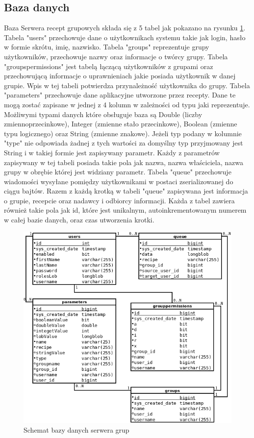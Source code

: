 \documentclass[11pt,a4paper,polish,thesis]{dcsbook}
\begin{document}
\subsection{Baza danych}
Baza Serwera recept grupowych składa się z 5 tabel jak pokazano na rysunku \ref{fig:server_db}. 
Tabela "users" przechowuje  dane o użytkownikach systemu takie jak login, hasło w formie skrótu, imię, nazwisko.
Tabela "groups" reprezentuje grupy użytkowników, przechowuje nazwy oraz informacje o twórcy grupy.
Tabela "groupspermissions" jest tabelą łączącą użytkowników z grupami oraz przechowującą informacje o uprawnieniach jakie posiada użytkownik w danej grupie. 
Wpis w tej tabeli potwierdza przynależność użytkownika do grupy.
Tabela "parameters" przechowuje dane aplikacyjne utworzone przez recepty. 
Dane te mogą zostać zapisane w jednej z 4 kolumn w zależności od typu jaki reprezentuje. 
Możliwymi typami danych które obsługuje baza są Double (liczby zmiennoprzecinkowe), Integer (zmienne stało przecinkowe), Boolean (zmienne typu logicznego) oraz String (zmienne znakowe). 
Jeżeli typ podany w kolumnie "type" nie odpowiada żadnej z tych wartości za domyślny typ przyjmowany jest String i w takiej formie jest zapisywany parametr.
Każdy z parametrów zapisywany w tej tabeli posiada takie pola jak nazwa, nazwa właściciela, nazwa grupy w obrębie której jest widziany parametr.
Tabela "queue" przechowuje wiadomości wysyłane pomiędzy użytkownikami w postaci zserializowanej do ciągu bajtów.
Razem z każdą krotką w tabeli "queue" zapisywana jest informacja o grupie, recepcie oraz nadawcy i odbiorcy informacji.
Każda z tabel zawiera również takie pola jak id, które jest unikalnym, autoinkrementowanym numerem w całej bazie danych, oraz czas utworzenia krotki.
\begin{figure}[H]
  \centering
  \includegraphics[scale=0.7]{./resources/server_db.png}
  \caption{Schemat bazy danych serwera grup}
  \label{fig:server_db}
\end{figure}
\end{document}
